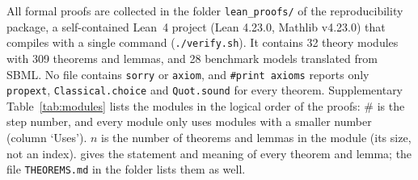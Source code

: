 All formal proofs are collected in the folder \texttt{lean\_proofs/} of the reproducibility package, a self-contained Lean~4 project (Lean 4.23.0, Mathlib v4.23.0) that compiles with a single command (\texttt{./verify.sh}). It contains 32 theory modules with 309 theorems and lemmas, and 28 benchmark models translated from SBML. No file contains \texttt{sorry} or \texttt{axiom}, and \texttt{\#print axioms} reports only \texttt{propext}, \texttt{Classical.choice} and \texttt{Quot.sound} for every theorem. Supplementary Table~\ref{tab:modules} lists the modules in the logical order of the proofs: \# is the step number, and every module only uses modules with a smaller number (column `Uses'). $n$ is the number of theorems and lemmas in the module (its size, not an index).  gives the statement and meaning of every theorem and lemma; the file \texttt{THEOREMS.md} in the folder lists them as well.

